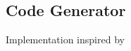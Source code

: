\subsection{Code Generator}
\label{sec:CodeGenImplement}
Implementation inspired by \cite{LLVMTutorial}